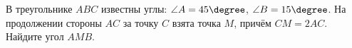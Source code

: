 \begin{ex}
	\begin{condition}
		В треугольнике \( ABC  \) известны углы: \( \angle A = 45\degree \), \( \angle B = 15\degree \). На продолжении стороны \( AC  \) за точку \( C  \) взята точка \( M \), причём \( CM =2AC \). Найдите угол \( AMB \).
	\end{condition}
\end{ex}